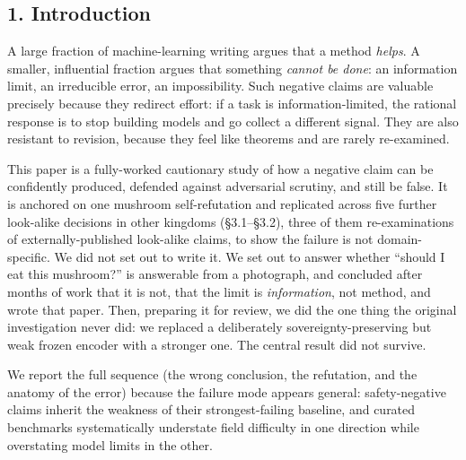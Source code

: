 \subsection{1. Introduction}\label{introduction}

A large fraction of machine-learning writing argues that a method
\emph{helps}. A smaller, influential fraction argues that something
\emph{cannot be done}: an information limit, an irreducible error, an
impossibility. Such negative claims are valuable precisely because they
redirect effort: if a task is information-limited, the rational response
is to stop building models and go collect a different signal. They are
also resistant to revision, because they feel like theorems and are
rarely re-examined.

This paper is a fully-worked cautionary study of how a negative claim
can be confidently produced, defended against adversarial scrutiny, and
still be false. It is anchored on one mushroom self-refutation and
replicated across five further look-alike decisions in other kingdoms
(§3.1--§3.2), three of them re-examinations of externally-published
look-alike claims, to show the failure is not domain-specific. We did
not set out to write it. We set out to answer whether ``should I eat
this mushroom?'' is answerable from a photograph, and concluded after
months of work that it is not, that the limit is \emph{information}, not
method, and wrote that paper. Then, preparing it for review, we did the
one thing the original investigation never did: we replaced a
deliberately sovereignty-preserving but weak frozen encoder with a
stronger one. The central result did not survive.

We report the full sequence (the wrong conclusion, the refutation, and
the anatomy of the error) because the failure mode appears general:
safety-negative claims inherit the weakness of their strongest-failing
baseline, and curated benchmarks systematically understate field
difficulty in one direction while overstating model limits in the other.

